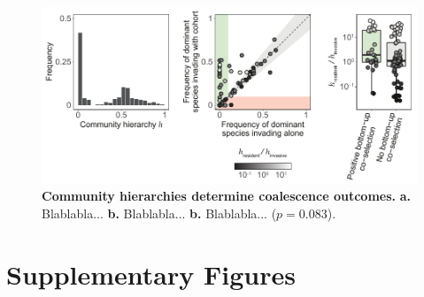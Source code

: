\documentclass[a4paper,10pt]{article}
\begin{document}
\begin{figure}[!h]
\centering
\internallinenumbers
\includegraphics[scale=0.7,keepaspectratio]{figs/fig5.pdf}
\caption{\textbf{Community hierarchies determine coalescence outcomes.}
\textbf{a.} Blablabla...
\textbf{b.} Blablabla...
\textbf{b.} Blablabla... ($p=0.083$).}
\label{fig5}
\end{figure}

\clearpage

\section*{Supplementary Figures}

\renewcommand{\thefigure}{S\arabic{figure}}
\setcounter{figure}{0} 
\end{document}
